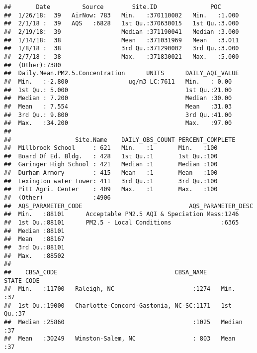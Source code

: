 \documentclass[]{article}
\begin{document}
\begin{verbatim}
##       Date         Source        Site.ID               POC       
##  1/26/18:  39   AirNow: 783   Min.   :370110002   Min.   :1.000  
##  2/1/18 :  39   AQS   :6828   1st Qu.:370630015   1st Qu.:3.000  
##  2/19/18:  39                 Median :371190041   Median :3.000  
##  1/14/18:  38                 Mean   :371031969   Mean   :3.011  
##  1/8/18 :  38                 3rd Qu.:371290002   3rd Qu.:3.000  
##  2/7/18 :  38                 Max.   :371830021   Max.   :5.000  
##  (Other):7380                                                    
##  Daily.Mean.PM2.5.Concentration      UNITS      DAILY_AQI_VALUE
##  Min.   :-2.800                 ug/m3 LC:7611   Min.   : 0.00  
##  1st Qu.: 5.000                                 1st Qu.:21.00  
##  Median : 7.200                                 Median :30.00  
##  Mean   : 7.554                                 Mean   :31.03  
##  3rd Qu.: 9.800                                 3rd Qu.:41.00  
##  Max.   :34.200                                 Max.   :97.00  
##                                                                
##                  Site.Name    DAILY_OBS_COUNT PERCENT_COMPLETE
##  Millbrook School     : 621   Min.   :1       Min.   :100     
##  Board Of Ed. Bldg.   : 428   1st Qu.:1       1st Qu.:100     
##  Garinger High School : 421   Median :1       Median :100     
##  Durham Armory        : 415   Mean   :1       Mean   :100     
##  Lexington water tower: 411   3rd Qu.:1       3rd Qu.:100     
##  Pitt Agri. Center    : 409   Max.   :1       Max.   :100     
##  (Other)              :4906                                   
##  AQS_PARAMETER_CODE                              AQS_PARAMETER_DESC
##  Min.   :88101      Acceptable PM2.5 AQI & Speciation Mass:1246    
##  1st Qu.:88101      PM2.5 - Local Conditions              :6365    
##  Median :88101                                                     
##  Mean   :88167                                                     
##  3rd Qu.:88101                                                     
##  Max.   :88502                                                     
##                                                                    
##    CBSA_CODE                                 CBSA_NAME      STATE_CODE
##  Min.   :11700   Raleigh, NC                      :1274   Min.   :37  
##  1st Qu.:19000   Charlotte-Concord-Gastonia, NC-SC:1171   1st Qu.:37  
##  Median :25860                                    :1025   Median :37  
##  Mean   :30249   Winston-Salem, NC                : 803   Mean   :37  

\end{verbatim}
\end{document}
